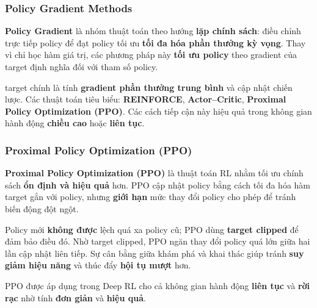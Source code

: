 \subsubsection{Policy Gradient Methods}

\begin{dinhnghia}[title={Phương pháp Policy Gradient}]
\textbf{Policy Gradient} là nhóm thuật toán theo hướng \textbf{lặp chính sách}: điều chỉnh trực tiếp policy để đạt policy tối ưu \textbf{tối đa hóa phần thưởng kỳ vọng}.
Thay vì chỉ học hàm giá trị, các phương pháp này \textbf{tối ưu policy} theo gradient của target định nghĩa đối với tham số policy.
\end{dinhnghia}

\begin{phuongphap}[title={target và các biến thể}]
target chính là tính \textbf{gradient phần thưởng trung bình} và cập nhật chiến lược.
Các thuật toán tiêu biểu: \textbf{REINFORCE}, \textbf{Actor--Critic}, \textbf{Proximal Policy Optimization (PPO)}.
Các cách tiếp cận này hiệu quả trong không gian hành động \textbf{chiều cao} hoặc \textbf{liên tục}.
\end{phuongphap}

\subsubsection{Proximal Policy Optimization (PPO)}

\begin{dinhnghia}[title={PPO}]
\textbf{Proximal Policy Optimization (PPO)} là thuật toán RL nhằm tối ưu chính sách \textbf{ổn định và hiệu quả} hơn.
PPO cập nhật policy bằng cách tối đa hóa hàm target gắn với policy, nhưng \textbf{giới hạn} mức thay đổi policy cho phép để tránh biến động đột ngột.
\end{dinhnghia}

\begin{phuongphap}[title={target clipped}]
Policy mới \textbf{không được} lệch quá xa policy cũ; PPO dùng \textbf{target clipped} để đảm bảo điều đó.
Nhờ target clipped, PPO ngăn thay đổi policy quá lớn giữa hai lần cập nhật liên tiếp.
Sự cân bằng giữa khám phá và khai thác giúp tránh \textbf{suy giảm hiệu năng} và thúc đẩy \textbf{hội tụ mượt} hơn.
\end{phuongphap}

\begin{vidu}[title={Phạm vi ứng dụng PPO}]
PPO được áp dụng trong Deep RL cho cả không gian hành động \textbf{liên tục} và \textbf{rời rạc} nhờ tính \textbf{đơn giản} và \textbf{hiệu quả}.
\end{vidu}

